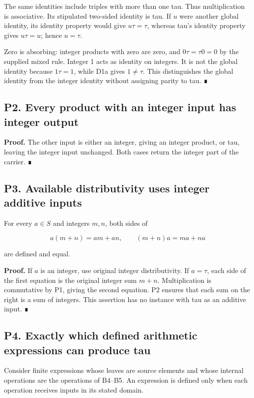The same identities include triples with more than one tau. Thus
multiplication is associative. Its stipulated two-sided identity is tau.
If \(u\) were another global identity, its identity property would give
\(u\tau=\tau\), whereas tau's identity property gives \(u\tau=u\); hence
\(u=\tau\).

Zero is absorbing: integer products with zero are zero, and
\(0\tau=\tau0=0\) by the supplied mixed rule. Integer 1 acts as identity
on integers. It is not the global identity because \(1\tau=1\), while
D1a gives \(1\ne\tau\). This distinguishes the global identity from the
integer identity without assigning parity to tau. ∎

\subsection{P2. Every product with an integer input has integer
output}\label{uad-p2.-every-product-with-an-integer-input-has-integer-output}

\textbf{Proof.} The other input is either an integer, giving an integer
product, or tau, leaving the integer input unchanged. Both cases return
the integer part of the carrier. ∎

\subsection{P3. Available distributivity uses integer additive
inputs}\label{uad-p3.-available-distributivity-uses-integer-additive-inputs}

For every \(a\in S\) and integers \(m,n\), both sides of

\[
a(m+n)=am+an,
\qquad
(m+n)a=ma+na
\]

are defined and equal.

\textbf{Proof.} If \(a\) is an integer, use original integer
distributivity. If \(a=\tau\), each side of the first equation is the
original integer sum \(m+n\). Multiplication is commutative by P1,
giving the second equation. P2 ensures that each sum on the right is a
sum of integers. This assertion has no instance with tau as an additive
input. ∎

\subsection{P4. Exactly which defined arithmetic expressions can produce
tau}\label{uad-p4.-exactly-which-defined-arithmetic-expressions-can-produce-tau}

Consider finite expressions whose leaves are source elements and whose
internal operations are the operations of B4--B5. An expression is
defined only when each operation receives inputs in its stated domain.

